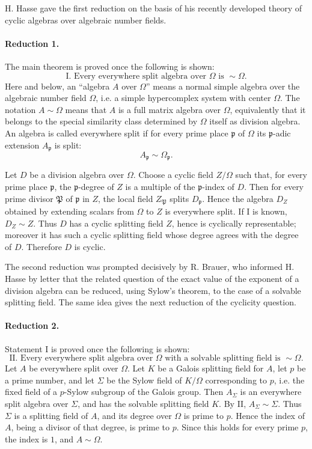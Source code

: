 \documentclass[11pt]{article}
\providecommand{\Om}{\Omega}
\begin{document}
H. Hasse gave the first reduction on the basis of his recently developed theory of cyclic algebras over algebraic number fields.

\paragraph{Reduction 1.}
The main theorem is proved once the following is shown:
\[
\text{I. Every everywhere split algebra over }\Om\text{ is } \sim\Om .
\]
Here and below, an ``algebra \(A\) over \(\Om\)'' means a normal simple algebra over the algebraic number field \(\Om\), i.e. a simple hypercomplex system with center \(\Om\). The notation \(A\sim\Om\) means that \(A\) is a full matrix algebra over \(\Om\), equivalently that it belongs to the special similarity class determined by \(\Om\) itself as division algebra. An algebra is called everywhere split if for every prime place \(\mathfrak p\) of \(\Om\) its \(\mathfrak p\)-adic extension \(A_{\mathfrak p}\) is split:
\[
        A_{\mathfrak p}\sim\Om_{\mathfrak p}.
\]

Let \(D\) be a division algebra over \(\Om\). Choose a cyclic field \(Z/\Om\) such that, for every prime place \(\mathfrak p\), the \(\mathfrak p\)-degree of \(Z\) is a multiple of the \(\mathfrak p\)-index of \(D\). Then for every prime divisor \(\mathfrak P\) of \(\mathfrak p\) in \(Z\), the local field \(Z_{\mathfrak P}\) splits \(D_{\mathfrak p}\). Hence the algebra \(D_Z\) obtained by extending scalars from \(\Om\) to \(Z\) is everywhere split. If I is known, \(D_Z\sim Z\). Thus \(D\) has a cyclic splitting field \(Z\), hence is cyclically representable; moreover it has such a cyclic splitting field whose degree agrees with the degree of \(D\). Therefore \(D\) is cyclic.

The second reduction was prompted decisively by R. Brauer, who informed H. Hasse by letter that the related question of the exact value of the exponent of a division algebra can be reduced, using Sylow's theorem, to the case of a solvable splitting field. The same idea gives the next reduction of the cyclicity question.

\paragraph{Reduction 2.}
Statement I is proved once the following is shown:
\[
\text{II. Every everywhere split algebra over }\Om\text{ with a solvable splitting field is } \sim\Om .
\]
Let \(A\) be everywhere split over \(\Om\). Let \(K\) be a Galois splitting field for \(A\), let \(p\) be a prime number, and let \(\Sigma\) be the Sylow field of \(K/\Om\) corresponding to \(p\), i.e. the fixed field of a \(p\)-Sylow subgroup of the Galois group. Then \(A_\Sigma\) is an everywhere split algebra over \(\Sigma\), and has the solvable splitting field \(K\). By II, \(A_\Sigma\sim\Sigma\). Thus \(\Sigma\) is a splitting field of \(A\), and its degree over \(\Om\) is prime to \(p\). Hence the index of \(A\), being a divisor of that degree, is prime to \(p\). Since this holds for every prime \(p\), the index is \(1\), and \(A\sim\Om\).
\end{document}
